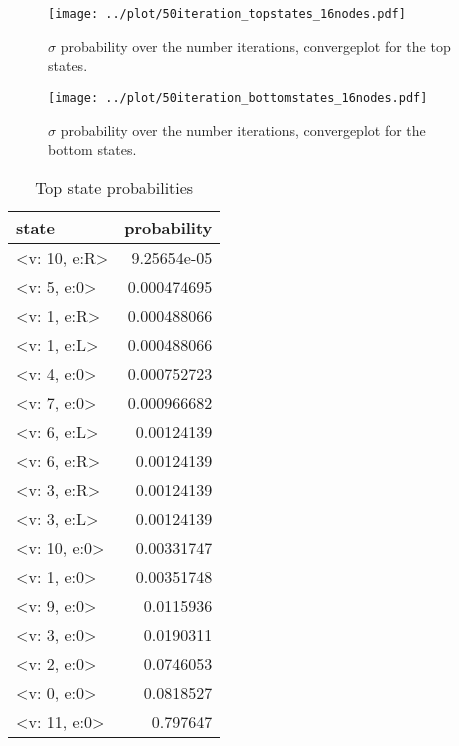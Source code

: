 \documentclass[a4paper,11pt]{kth-mag}
\begin{document}
\begin{figure}[h!]
    \centering
    \texttt{[image: ../plot/50iteration\_topstates\_16nodes.pdf]}
  \caption{$\sigma$ probability over the number iterations, convergeplot for the top states.}
\end{figure}

\begin{figure}[h!]
    \centering
    \texttt{[image: ../plot/50iteration\_bottomstates\_16nodes.pdf]}
  \caption{$\sigma$ probability over the number iterations, convergeplot for the bottom states.}
\end{figure}

\begin{center}
\begin{table}
\begin{center}
\begin{tabular}{ l | r }
    state & probability \\ \hline 
    <v: 10, e:R> & 9.25654e-05 \\ \hline 
    <v: 5, e:0> & 0.000474695 \\ \hline 
    <v: 1, e:R> & 0.000488066 \\ \hline 
    <v: 1, e:L> & 0.000488066 \\ \hline 
    <v: 4, e:0> & 0.000752723 \\ \hline 
    <v: 7, e:0> & 0.000966682 \\ \hline 
    <v: 6, e:L> & 0.00124139 \\ \hline 
    <v: 6, e:R> & 0.00124139 \\ \hline 
    <v: 3, e:R> & 0.00124139\\ \hline 
    <v: 3, e:L> & 0.00124139 \\ \hline 
    <v: 10, e:0> & 0.00331747 \\ \hline 
    <v: 1, e:0> & 0.00351748 \\ \hline 
    <v: 9, e:0> & 0.0115936 \\ \hline 
    <v: 3, e:0> & 0.0190311 \\ \hline 
    <v: 2, e:0> & 0.0746053 \\ \hline 
    <v: 0, e:0> & 0.0818527 \\ \hline 
    <v: 11, e:0> & 0.797647 \\ \hline 
\end{tabular}
\end{center}
\caption{Top state probabilities}
\end{table}
\end{center}



\end{document}
